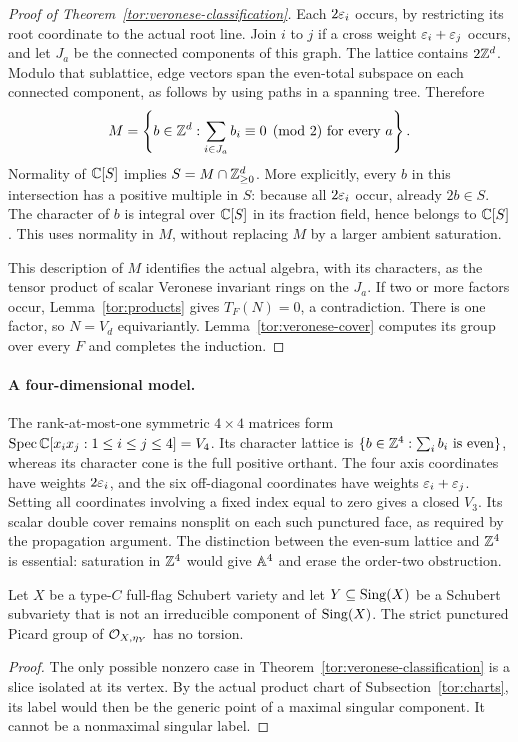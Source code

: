 \begin{proof}[Proof of Theorem~\ref{tor:veronese-classification}]
Each $2\varepsilon_i$ occurs, by restricting its root coordinate to the actual root line. Join $i$ to $j$ if a cross weight $\varepsilon_i+\varepsilon_j$ occurs, and let $J_a$ be the connected components of this graph. The lattice contains $2\mathbb Z^d$. Modulo that sublattice, edge vectors span the even-total subspace on each connected component, as follows by using paths in a spanning tree. Therefore
\[
 M=\left\{b\in\mathbb Z^d:
   \sum_{i\in J_a}b_i\equiv0\pmod2
   \text{ for every }a\right\}.
\]
Normality of $\mathbb C[S]$ implies $S=M\cap\mathbb Z_{\ge0}^d$. More explicitly, every $b$ in this intersection has a positive multiple in $S$: because all $2\varepsilon_i$ occur, already $2b\in S$. The character of $b$ is integral over $\mathbb C[S]$ in its fraction field, hence belongs to $\mathbb C[S]$. This uses normality in $M$, without replacing $M$ by a larger ambient saturation.

This description of $M$ identifies the actual algebra, with its characters, as the tensor product of scalar Veronese invariant rings on the $J_a$. If two or more factors occur, Lemma~\ref{tor:products} gives $T_F(N)=0$, a contradiction. There is one factor, so $N=V_d$ equivariantly. Lemma~\ref{tor:veronese-cover} computes its group over every $F$ and completes the induction.
\end{proof}

\paragraph{A four-dimensional model.}
The rank-at-most-one symmetric $4\times4$ matrices form $\operatorname{Spec}\mathbb C[x_ix_j:1\le i\le j\le4]=V_4$. Its character lattice is $\{b\in\mathbb Z^4:\sum_i b_i\text{ is even}\}$, whereas its character cone is the full positive orthant. The four axis coordinates have weights $2\varepsilon_i$, and the six off-diagonal coordinates have weights $\varepsilon_i+\varepsilon_j$. Setting all coordinates involving a fixed index equal to zero gives a closed $V_3$. Its scalar double cover remains nonsplit on each such punctured face, as required by the propagation argument. The distinction between the even-sum lattice and $\mathbb Z^4$ is essential: saturation in $\mathbb Z^4$ would give $\mathbb A^4$ and erase the order-two obstruction.

\begin{corollary}\label{tor:c-nonmaximal}
Let $X$ be a type-$C$ full-flag Schubert variety and let $Y\subseteq\operatorname{Sing}(X)$ be a Schubert subvariety that is not an irreducible component of $\operatorname{Sing}(X)$. The strict punctured Picard group of $\mathcal O_{X,\eta_Y}$ has no torsion.
\end{corollary}
\begin{proof}
The only possible nonzero case in Theorem~\ref{tor:veronese-classification} is a slice isolated at its vertex. By the actual product chart of Subsection~\ref{tor:charts}, its label would then be the generic point of a maximal singular component. It cannot be a nonmaximal singular label.
\end{proof}

